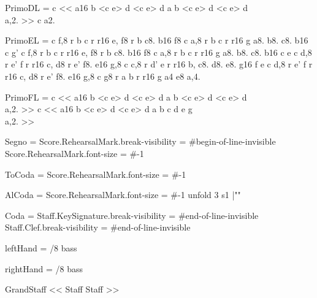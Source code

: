 PrimoDL = {
 { \relative c { << { a16 b <c e> d <c e> d a b <c e> d <c e> d} \\ { a,2. } >> } }
 { \relative c { a2. } }
}

PrimoEL = {
 { \relative c { f,8 r b c r r16 e, f8 r b c8. b16 f8 } }
 { \relative c { a,8 r b c r r16 g a8. b8. c8. b16 c g' } }
 { \relative c { f,8 r b c r r16 e, f8 r b c8. b16 f8 } }
 { \relative c { a,8 r b c r r16 g a8. b8. c8. b16 c e } }
 { \relative c { d,8 r e' f r r16 c, d8 r e' f8. e16 g,8 } }
 { \relative c { c,8 r d' e r r16 b, c8. d8. e8. g16 f e } }
 { \relative c { d,8 r e' f r r16 c, d8 r e' f8. e16 g,8 } }
 { \relative c { g8 r a b r r16 g a4 e8 a,4. } }
}

PrimoFL = {
 { \relative c { << { a16 b <c e> d <c e> d a b <c e> d <c e> d} \\ { a,2. } >> } }
 { \relative c { << { a16 b <c e> d <c e> d a b c d e g } \\ { a,2. } >> } }
}

Segno = {
    \once \override Score.RehearsalMark.break-visibility = #begin-of-line-invisible
    \once \override Score.RehearsalMark.font-size = #-1
    \mark {}
}

ToCoda = {
    \once \override Score.RehearsalMark.font-size = #-1
    \mark {}
}

AlCoda = {
    \cadenzaOn \stopStaff
    \once \override Score.RehearsalMark.font-size = #-1
    \mark {}
    \repeat unfold 3 { s1 \bar "" }
    \startStaff \cadenzaOff
}

Coda = {
    \break
    \mark {}
    \once \override Staff.KeySignature.break-visibility = #end-of-line-invisible
    \once \override Staff.Clef.break-visibility = #end-of-line-invisible
}

leftHand = {
  /8
  \clef bass
  \PrimoAL
  \Segno
  \PrimoBL
  \PrimoCL
  \ToCoda
  \PrimoDL
  \PrimoEL
  \AlCoda
  \Coda
  \PrimoFL
  \PrimoCL
  \PrimoDL
}

rightHand = {
  /8
  \clef bass
  \PrimoAR
  \Segno
  \PrimoBR
  \PrimoCR
  \ToCoda
  \PrimoDR
  \PrimoER
  \AlCoda
  \Coda
  \PrimoFR
  \PrimoCR
  \PrimoDR
}

\new GrandStaff <<
  \new Staff \rightHand
  \new Staff \leftHand
>>
